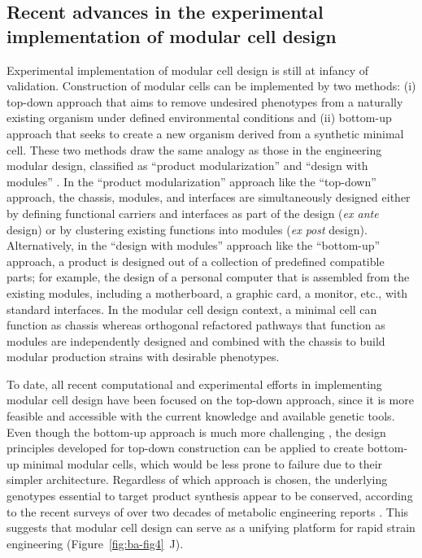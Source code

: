\subsection{Recent advances in the experimental implementation of modular cell design}

Experimental implementation of modular cell design is still at infancy of validation.
Construction of modular cells can be implemented by two methods: (i) top-down approach that aims to remove undesired phenotypes from a naturally existing organism under defined environmental conditions \citep{trinh2008b, trinh2006} and (ii) bottom-up approach that seeks to create a new organism derived from a synthetic minimal cell.
\citep{hutchison2016} These two methods draw the same analogy as those in the engineering modular design, classified as ``product modularization'' and ``design with modules'' \citep{bonvoisin2016}.
In the ``product modularization'' approach like the ``top-down'' approach, the chassis, modules, and interfaces are simultaneously designed either by defining functional carriers and interfaces as part of the design (\emph{ex ante} design) or by clustering existing functions into modules (\emph{ex post} design).
Alternatively, in the ``design with modules'' approach like the ``bottom-up'' approach, a product is designed out of a collection of predefined compatible parts; for example, the design of a personal computer that is assembled from the existing modules, including a motherboard, a graphic card, a monitor, etc., with standard interfaces.
In the modular cell design context, a minimal cell can function as chassis whereas orthogonal refactored pathways that function as modules are independently designed and combined with the chassis to build modular production strains with desirable phenotypes.

To date, all recent computational \citep{garcia2019, trinh2015} and experimental \citep{layton2014, wilbanks2017} efforts in implementing modular cell design have been focused on the top-down approach, since it is more feasible and accessible with the current knowledge and available genetic tools.
Even though the bottom-up approach is much more challenging \citep{hutchison2016}, the design principles developed for top-down construction can be applied to create bottom-up minimal modular cells, which would be less prone to failure due to their simpler architecture.
Regardless of which approach is chosen, the underlying genotypes essential to target product synthesis appear to be conserved, according to the recent surveys of over two decades of metabolic engineering reports \citep{king2017, winkler2015}.
This suggests that modular cell design can serve as a unifying platform for rapid strain engineering (Figure~\ref{fig:ba-fig4}~J).

